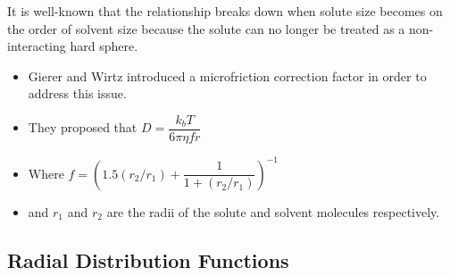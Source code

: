 \documentclass{article}
\begin{document}
  \noindent It is well-known that the relationship breaks down when solute size becomes
  on the order of solvent size because the solute can no longer be treated
  as a non-interacting hard sphere. %
  \begin{itemize}
    \item Gierer and Wirtz introduced a microfriction correction factor in order to 
    address this issue. 
    \item They proposed that $D = \dfrac{k_bT}{6\pi\eta fr}$
    \item Where $f = \left(1.5(r_2/r_1) + \dfrac{1}{1 + (r_2/r_1)}\right)^{-1}$
    \item and $r_1$ and $r_2$ are the radii of the solute and solvent molecules
    respectively.
  \end{itemize}

  \subsection*{Radial Distribution Functions}\label{method:rdfs}
\end{document}
